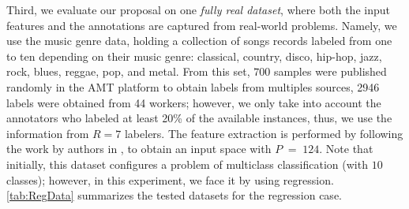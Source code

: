 \documentclass[journal]{IEEEtran}
\DeclareMathOperator{\igual}{\!\,=\!\,}
\begin{document}
Third, we evaluate our proposal on one \textit{fully real dataset}, where both the input features and the annotations are captured from real-world problems. Namely, we use the music genre data, holding a collection of songs records labeled from one to ten depending on their music genre: classical, country, disco, hip-hop, jazz, rock, blues, reggae, pop, and metal. From this set, $700$ samples were published randomly in the AMT platform to obtain labels from multiples sources, 2946 labels were obtained from 44 workers; however, we only take into account the annotators who labeled at least 20\% of the available instances, thus, we use the information from $R = 7$ labelers. The feature extraction is performed by following the work by authors in \cite{rodrigues2013learning}, to obtain an input space with $P\igual124$. Note that initially, this dataset configures a problem of multiclass classification (with $10$ classes); however, in this experiment, we face it by using regression. \cref{tab:RegData} summarizes the tested datasets for the regression case.

\begin{table}[!tb]
	\caption{Datasets for regression.
	}
	\label{tab:RegData}
	\centering
\end{table}
\end{document}
